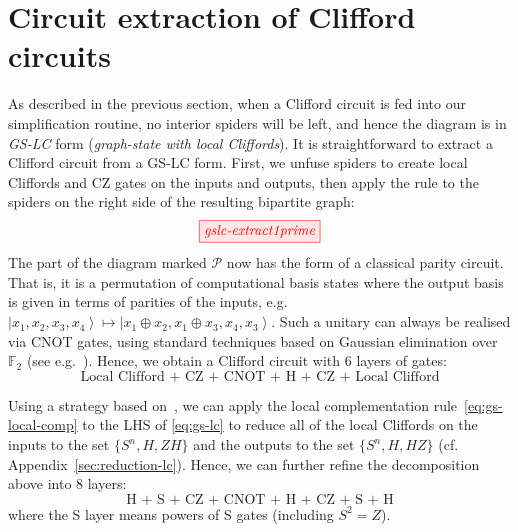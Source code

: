 \documentclass[a4paper,onecolumn,superscriptaddress,11pt,accepted=2020-04-27]{quantumarticle}
\newcommand{\ket}[1]{\ensuremath{\left|  #1 \right\rangle}}
\theoremstyle{definition}
\newtheorem{remark}[theorem]{Remark}
\begin{document}

\section{Circuit extraction of Clifford circuits}\label{sec:clifford}

As described in the previous section, when a Clifford circuit is fed into our simplification routine, no interior spiders will be left, and hence the diagram is in \emph{GS-LC} form (\emph{graph-state with local Cliffords}). It is straightforward to extract a Clifford circuit from a GS-LC form. First, we unfuse spiders to create local Cliffords and CZ gates on the inputs and outputs, then apply the \HadamardRule rule to the spiders on the right side of the resulting bipartite graph:
\begin{equation}\label{eq:gs-lc}
\scalebox{1.0}{\tikzfig{gslc-extract1prime}}
\end{equation}
The part of the diagram marked $\mathcal P$ now has the form of a classical parity circuit. That is, it is a permutation of computational basis states where the output basis is given in terms of parities of the inputs, e.g.
$ \ket{x_1, x_2, x_3, x_4} \mapsto \ket{x_1 \oplus x_2, x_1 \oplus x_3, x_4, x_3}.$
Such a unitary can always be realised via CNOT gates, using standard techniques based on Gaussian elimination over $\mathbb F_2$ (see e.g.~\cite{markov2008optimal}). Hence, we obtain a Clifford circuit with 6 layers of gates:
\begin{equation*}
  \textrm{Local Clifford + CZ + CNOT + H + CZ + Local Clifford}
\end{equation*}

\noindent Using a strategy based on~\cite[Thm.~13]{Backens1}, we can apply the local complementation rule~\eqref{eq:gs-local-comp} to the LHS of \eqref{eq:gs-lc} to reduce all of the local Cliffords on the inputs to the set $\{S^n, H, ZH\}$ and the outputs to the set $\{S^n, H, HZ \}$ (cf. Appendix~\ref{sec:reduction-lc}). Hence, we can further refine the decomposition above into 8 layers:
\begin{equation}\label{eq:cliff-nf}
  \textrm{H + S + CZ + CNOT + H + CZ + S + H}
\end{equation}
where the S layer means powers of S gates (including $S^2 = Z$).
\end{document}
